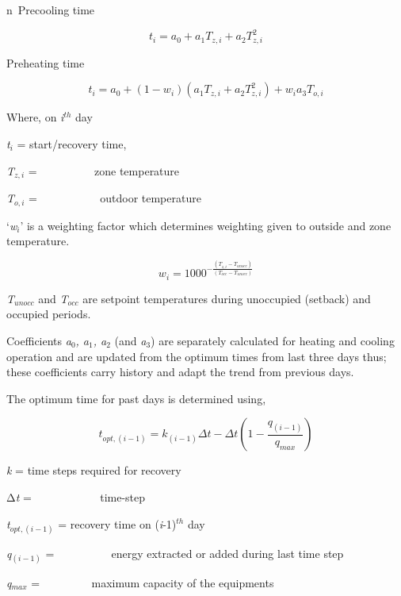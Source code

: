 n~Precooling time

\begin{equation}
{t_i} = {a_0} + {a_1}{T_{z,i}} + {a_2}T_{z,i}^2
\end{equation}

Preheating time

\begin{equation}
{t_i} = {a_0} + \left( {1 - {w_i}} \right)({a_1}{T_{z,i}} + {a_2}T_{z,i}^2) + {w_i}{a_3}{T_{o,i}}
\end{equation}

Where, on \emph{i}\(^{th}\) day

\emph{t\(_{i}\)} = start/recovery time,

\emph{T\(_{z,i}\)} = ~~~~~~~~~ zone temperature

\emph{T\(_{o,i}\)} = ~~~~~~~~~~ outdoor temperature

`\emph{w\(_{i}\)}' is a weighting factor which determines weighting given to outside and zone temperature.

\begin{equation}
{w_i} = {1000^{ - \frac{{\left( {{T_{z,i}} - {T_{unocc}}} \right)}}{{\left( {{T_{occ}} - {T_{unocc}}} \right)}}}}
\end{equation}

\emph{T\(_{unocc}\)} and \emph{T\(_{occ}\)} are setpoint temperatures during unoccupied (setback) and occupied periods.

Coefficients \emph{a\(_{0}\), a\(_{1}\), a\(_{2}\)} (and \emph{a\(_{3}\)}) are separately calculated for heating and cooling operation and are updated from the optimum times from last three days thus; these coefficients carry history and adapt the trend from previous days.

The optimum time for past days is determined using,

\begin{equation}
{t_{opt,\left( {i - 1} \right)}} = {k_{\left( {i - 1} \right)}}\Delta t - \Delta t\left( {1 - \frac{{{q_{\left( {i - 1} \right)}}}}{{{q_{max}}}}} \right)
\end{equation}

\emph{k} = time steps required for recovery

Δ\emph{t} = ~~~~~~~~~~~ time-step

\emph{t\(_{opt,(i-1)}\)} = recovery time on (\emph{i}-1)\(^{th}\) day

\emph{q\(_{(i-1)}\)} = ~~~~~~~~~ energy extracted or added during last time step

\emph{q\(_{max}\)} = ~~~~~~~~ maximum capacity of the equipments 
